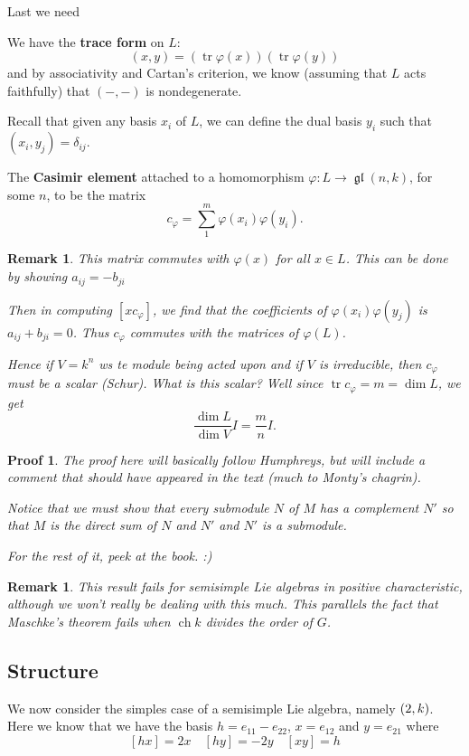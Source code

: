 \documentclass[12pt]{article}
\theoremstyle{nonumberbreak}
\theoremstyle{changebreak}
\theoremstyle{nonumberbreak}
\newtheorem{prf}{Proof}
\theoremstyle{change}
\newtheorem{rmk}[thm]{Remark}
\DeclareMathOperator{\ch}{ch}
\DeclareMathOperator{\gl}{\mathfrak{gl}}
\let\sl\relax
\DeclareMathOperator{\sl}{\mathfrak{sl}}
\DeclareMathOperator{\tr}{tr}
\begin{document}
Last we need
\begin{defn}
	We have the \textbf{trace form} on $L$:
	\[(x,y)=(\tr\varphi(x))(\tr\varphi(y))\]
	and by associativity and Cartan's criterion, we know (assuming that $L$ acts faithfully) that $(-,-)$ is nondegenerate.
\end{defn}
Recall that given any basis $x_i$ of $L$, we can define the dual basis $y_i$ such that $(x_i,y_j)=\delta_{ij}$.
\begin{defn}
	The \textbf{Casimir element} attached to a homomorphism $\varphi:L\to\gl(n,k)$, for some $n$, to be the matrix
	\[c_\varphi=\sum_1^m\varphi(x_i)\varphi(y_i).\]
\end{defn}
\begin{rmk}
	This matrix commutes with $\varphi(x)$ for all $x\in L$. This can be done by showing $a_{ij}=-b_{ji}$

	Then in computing $[xc_\varphi]$, we find that the coefficients of $\varphi(x_i)\varphi(y_j)$
	is $a_{ij}+b_{ji}=0$. Thus $c_\varphi$ commutes with the matrices of $\varphi(L)$.

	Hence if $V=k^n$ ws te module being acted upon and if $V$ is irreducible, then $c_\varphi$ must be a scalar (Schur).
	What is this scalar? Well since $\tr c_\varphi=m=\dim L$, we get
	\[\frac{\dim L}{\dim V}I=\frac{m}{n}I.\]
\end{rmk}
\begin{prf}
	The proof here will basically follow Humphreys, but will include a comment that \textit{should have appeared} in the text
	(much to Monty's chagrin).

	Notice that we must show that every submodule $N$ of $M$ has a complement $N'$ so that $M$ is the direct sum of $N$ and $N'$ and $N'$ is a submodule.

	For the rest of it, peek at the book. :)
\end{prf}
\begin{rmk}
	This result fails for semisimple Lie algebras in positive characteristic, although we won't really be dealing with this much.
	This parallels the fact that Maschke's theorem fails when $\ch k$ divides the order of $G$.
\end{rmk}
\subsection{Structure}
We now consider the simples case of a semisimple Lie algebra, namely $\sl(2,k)$. Here we know that we have the basis
$h=e_{11}-e_{22}$, $x=e_{12}$ and $y=e_{21}$ where
\[[hx]=2x\quad [hy]=-2y\quad [xy]=h\]
\end{document}
